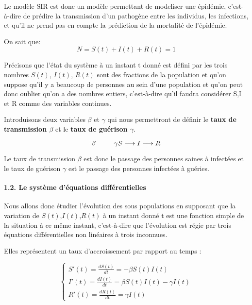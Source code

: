 \documentclass[
]{article}
\begin{document}
Le modèle SIR est donc un modèle permettant de modeliser une épidémie,
c'est-à-dire de prédire la transmission d'un pathogène entre les
individus, les infections, et qu'il ne prend pas en compte la prédiction
de la mortalité de l'épidémie.

On sait que: \[N = S(t) + I(t) + R(t) = 1\]

Précisons que l'état du système à un instant t donné est défini par les
trois nombres \(S(t)\), \(I(t)\), \(R(t)\) sont des fractions de la
population et qu'on suppose qu'il y a beaucoup de personnes au sein
d'une population et qu'on peut donc oublier qu'on a des nombres entiers,
c'est-à-dire qu'il faudra considérer S,I et R comme des variables
continues.

Introduisons deux variables \(\beta\) et \(\gamma\) qui nous permettront
de définir le \textbf{taux de transmission \(\beta\)} et le \textbf{taux
de guérison \(\gamma\)}.

\[\beta\ \ \ \ \ \ \ \ \gamma\\  S  \longrightarrow I \longrightarrow  R  \]

Le taux de transmission \(\beta\) est donc le passage des personnes
saines à infectées et le taux de guérison \(\gamma\) est le passage des
personnes infectées à guéries.

\hypertarget{le-systuxe8me-duxe9quations-diffuxe9rentielles}{%
\paragraph{1.2. Le système d'équations
différentielles}\label{le-systuxe8me-duxe9quations-diffuxe9rentielles}}

Nous allons donc étudier l'évolution des sous populations en supposant
que la variation de \(S(t)\),\(I(t)\),\(R(t)\) à un instant donné t est
une fonction simple de la situation à ce même instant, c'est-à-dire que
l'évolution est régie par trois équations différentielles non linéaires
à trois inconnues.

Elles représentent un taux d'accroissement par rapport au temps :

\[\begin{equation}
    \left\{
     \begin{array}{l}
        S'(t) = \frac{dS(t)}{dt} = - \beta S(t)  I(t)\\
        I'(t) = \frac{dI(t)}{dt} = \beta S(t)  I(t) - \gamma  I(t)\\
        R'(t) = \frac{dR(t)}{dt} = \gamma I(t)
      \end{array}
    \right.
\end{equation}\]
\end{document}
